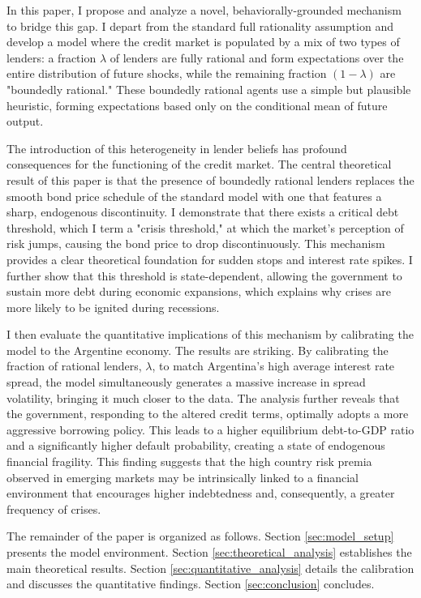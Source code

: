 In this paper, I propose and analyze a novel, behaviorally-grounded mechanism to bridge this gap. I depart from the standard full rationality assumption and develop a model where the credit market is populated by a mix of two types of lenders: a fraction $\lambda$ of lenders are fully rational and form expectations over the entire distribution of future shocks, while the remaining fraction $(1-\lambda)$ are "boundedly rational." These boundedly rational agents use a simple but plausible heuristic, forming expectations based only on the conditional mean of future output.

The introduction of this heterogeneity in lender beliefs has profound consequences for the functioning of the credit market. The central theoretical result of this paper is that the presence of boundedly rational lenders replaces the smooth bond price schedule of the standard model with one that features a sharp, endogenous discontinuity. I demonstrate that there exists a critical debt threshold, which I term a "crisis threshold," at which the market's perception of risk jumps, causing the bond price to drop discontinuously. This mechanism provides a clear theoretical foundation for sudden stops and interest rate spikes. I further show that this threshold is state-dependent, allowing the government to sustain more debt during economic expansions, which explains why crises are more likely to be ignited during recessions.

I then evaluate the quantitative implications of this mechanism by calibrating the model to the Argentine economy. The results are striking. By calibrating the fraction of rational lenders, $\lambda$, to match Argentina's high average interest rate spread, the model simultaneously generates a massive increase in spread volatility, bringing it much closer to the data. The analysis further reveals that the government, responding to the altered credit terms, optimally adopts a more aggressive borrowing policy. This leads to a higher equilibrium debt-to-GDP ratio and a significantly higher default probability, creating a state of endogenous financial fragility. This finding suggests that the high country risk premia observed in emerging markets may be intrinsically linked to a financial environment that encourages higher indebtedness and, consequently, a greater frequency of crises.

The remainder of the paper is organized as follows. Section \ref{sec:model_setup} presents the model environment. Section \ref{sec:theoretical_analysis} establishes the main theoretical results. Section \ref{sec:quantitative_analysis} details the calibration and discusses the quantitative findings. Section \ref{sec:conclusion} concludes.